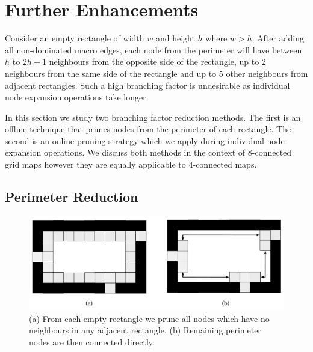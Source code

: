 \section{Further Enhancements}
\label{cha::rsr::enhancements}

Consider an empty rectangle of width $w$ and height $h$ where $w > h$.  After
adding all non-dominated macro edges, each node from the perimeter will have
between $h$ to $2h-1$ neighbours from the opposite side of the rectangle, up to
2 neighbours from the same side of the rectangle and up to 5 other neighbours
from adjacent rectangles.  Such a high branching factor is undesirable as
individual node expansion operations take longer.

In this section we study two branching factor reduction methods.  The first is
an offline technique that prunes nodes from the perimeter of each rectangle.
The second is an online pruning strategy which we apply during individual node
expansion operations.  We discuss both methods in the context of 8-connected
grid maps however they are equally applicable to 4-connected maps.

\subsection{Perimeter Reduction}
\label{cha::rsr::perimeter_reduction}

\begin{figure}[tb]
	\begin{center}
	\includegraphics[width=0.95\columnwidth, trim = 10mm 10mm 10mm 0mm]
	{chapter_rsr/diagrams/perimeter_pruning.pdf}
	\end{center}
	\vspace{-3pt}
	\caption[RSR enhancement: perimeter reduction]
    {\small
    (a) From each empty rectangle we prune all nodes which
	have no neighbours in any adjacent rectangle. (b)
	Remaining perimeter nodes are then connected directly.
}
\label{fig::rsr::perimeter_reduction}
\end{figure}


